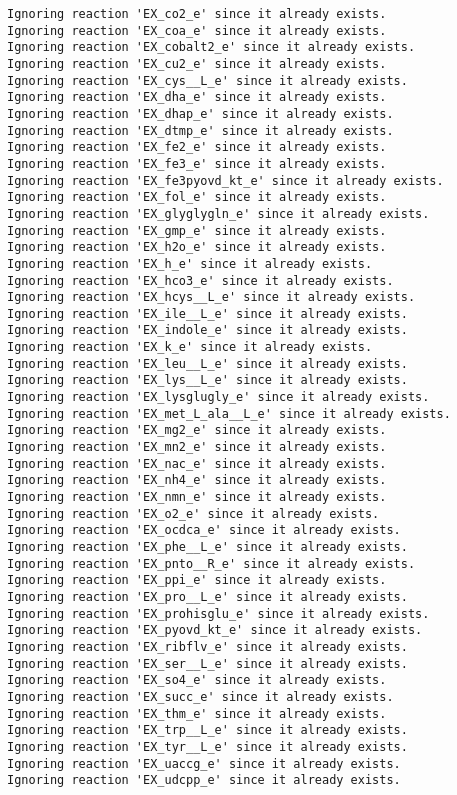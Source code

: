\documentclass[
  letterpaper,
  DIV=11,
  numbers=noendperiod]{scrartcl}
\begin{document}
\begin{verbatim}
Ignoring reaction 'EX_co2_e' since it already exists.
Ignoring reaction 'EX_coa_e' since it already exists.
Ignoring reaction 'EX_cobalt2_e' since it already exists.
Ignoring reaction 'EX_cu2_e' since it already exists.
Ignoring reaction 'EX_cys__L_e' since it already exists.
Ignoring reaction 'EX_dha_e' since it already exists.
Ignoring reaction 'EX_dhap_e' since it already exists.
Ignoring reaction 'EX_dtmp_e' since it already exists.
Ignoring reaction 'EX_fe2_e' since it already exists.
Ignoring reaction 'EX_fe3_e' since it already exists.
Ignoring reaction 'EX_fe3pyovd_kt_e' since it already exists.
Ignoring reaction 'EX_fol_e' since it already exists.
Ignoring reaction 'EX_glyglygln_e' since it already exists.
Ignoring reaction 'EX_gmp_e' since it already exists.
Ignoring reaction 'EX_h2o_e' since it already exists.
Ignoring reaction 'EX_h_e' since it already exists.
Ignoring reaction 'EX_hco3_e' since it already exists.
Ignoring reaction 'EX_hcys__L_e' since it already exists.
Ignoring reaction 'EX_ile__L_e' since it already exists.
Ignoring reaction 'EX_indole_e' since it already exists.
Ignoring reaction 'EX_k_e' since it already exists.
Ignoring reaction 'EX_leu__L_e' since it already exists.
Ignoring reaction 'EX_lys__L_e' since it already exists.
Ignoring reaction 'EX_lysglugly_e' since it already exists.
Ignoring reaction 'EX_met_L_ala__L_e' since it already exists.
Ignoring reaction 'EX_mg2_e' since it already exists.
Ignoring reaction 'EX_mn2_e' since it already exists.
Ignoring reaction 'EX_nac_e' since it already exists.
Ignoring reaction 'EX_nh4_e' since it already exists.
Ignoring reaction 'EX_nmn_e' since it already exists.
Ignoring reaction 'EX_o2_e' since it already exists.
Ignoring reaction 'EX_ocdca_e' since it already exists.
Ignoring reaction 'EX_phe__L_e' since it already exists.
Ignoring reaction 'EX_pnto__R_e' since it already exists.
Ignoring reaction 'EX_ppi_e' since it already exists.
Ignoring reaction 'EX_pro__L_e' since it already exists.
Ignoring reaction 'EX_prohisglu_e' since it already exists.
Ignoring reaction 'EX_pyovd_kt_e' since it already exists.
Ignoring reaction 'EX_ribflv_e' since it already exists.
Ignoring reaction 'EX_ser__L_e' since it already exists.
Ignoring reaction 'EX_so4_e' since it already exists.
Ignoring reaction 'EX_succ_e' since it already exists.
Ignoring reaction 'EX_thm_e' since it already exists.
Ignoring reaction 'EX_trp__L_e' since it already exists.
Ignoring reaction 'EX_tyr__L_e' since it already exists.
Ignoring reaction 'EX_uaccg_e' since it already exists.
Ignoring reaction 'EX_udcpp_e' since it already exists.

\end{verbatim}
\end{document}
